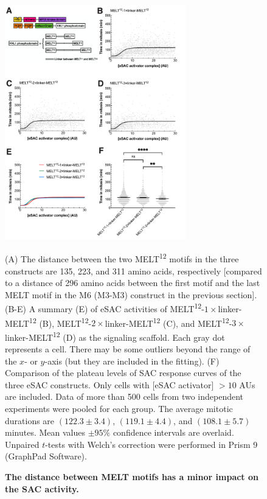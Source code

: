 \begin{figure}
    \centering
    \includegraphics[width=0.7\textwidth]{chapters/figures/DistanceEffect.pdf}
    \caption{\textbf{The distance between MELT motifs has a minor impact on the SAC activity.}}
    \noindent\justifying (A) The distance between the two MELT\textsuperscript{12} motifs in the three constructs are 135, 223, and 311 amino acids, respectively [compared to a distance of 296 amino acids between the first motif and the last MELT motif in the M6 (M3-M3) construct in the previous section]. (B-E) A summary (E) of eSAC activities of MELT\textsuperscript{12}-$1\times$linker-MELT\textsuperscript{12} (B), MELT\textsuperscript{12}-$2\times$linker-MELT\textsuperscript{12} (C), and MELT\textsuperscript{12}-$3\times$linker-MELT\textsuperscript{12} (D) as the signaling scaffold. Each gray dot represents a cell. There may be some outliers beyond the range of the $x$- or $y$-axis (but they are included in the fitting).  (F) Comparison of the plateau levels of SAC response curves of the three eSAC constructs. Only cells with [eSAC activator] $> 10$ AUs are included. Data of more than 500 cells from two independent experiments were pooled for each group. The average mitotic durations are $(122.3 \pm 3.4)$, $(119.1 \pm 4.4)$, and $(108.1 \pm 5.7)$ minutes. Mean values $\pm 95\%$ confidence intervals are overlaid. Unpaired $t$-tests with Welch's correction were performed in Prism 9 (GraphPad Software).
    \label{DistanceEffect}
\end{figure}

